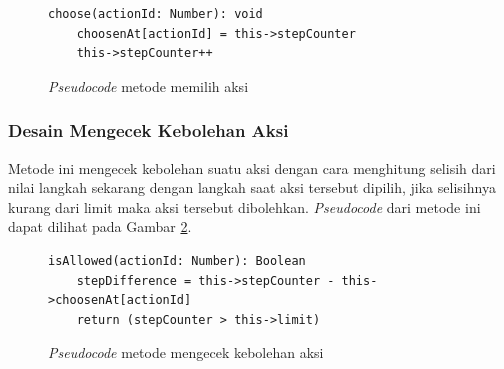 \begin{figure}[ht]
	\begin{lstlisting}[firstnumber=0]
	choose(actionId: Number): void
	choosenAt[actionId] = this->stepCounter
	this->stepCounter++
	\end{lstlisting}
	\caption{\textit{Pseudocode} metode memilih aksi}
	\label{psdo:tabu_choose}
\end{figure}

\subsubsection{Desain Mengecek Kebolehan Aksi}
Metode ini mengecek kebolehan suatu aksi dengan cara menghitung selisih dari nilai langkah sekarang dengan langkah saat aksi tersebut dipilih, jika selisihnya kurang dari limit maka aksi tersebut dibolehkan. \textit{Pseudocode} dari metode ini dapat dilihat pada Gambar \ref{psdo:tabu_isAllowed}.

\begin{figure}[ht]
	\begin{lstlisting}[firstnumber=0]
	isAllowed(actionId: Number): Boolean
	stepDifference = this->stepCounter - this->choosenAt[actionId]
	return (stepCounter > this->limit)
	\end{lstlisting}
	\caption{\textit{Pseudocode} metode mengecek kebolehan aksi}
	\label{psdo:tabu_isAllowed}
\end{figure}